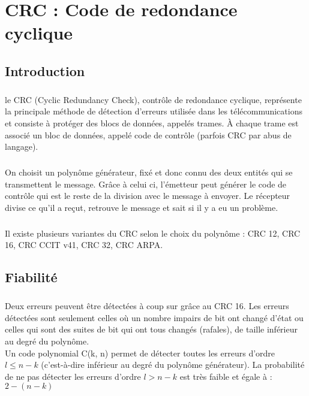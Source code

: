 
\chapter{CRC : Code de redondance cyclique}

    \section{Introduction}

        \paragraph{}
le CRC (Cyclic Redundancy Check), contrôle de redondance cyclique,
représente la principale méthode de détection d'erreurs utilisée dans les télécommunications et
consiste à protéger des blocs de données, appelés trames.
À chaque trame est associé un bloc de données, appelé code de contrôle (parfois CRC par abus de langage).
        \paragraph{}
On choisit un polynôme générateur, fixé et donc connu des deux entités qui se transmettent le message.
Grâce à celui ci, l'émetteur peut générer le code de contrôle qui est le reste de la division avec le message à envoyer.
Le récepteur divise ce qu'il a reçut, retrouve le message et sait si il y a eu un problème.
        \paragraph{}
Il existe plusieurs variantes du CRC selon le choix du polynôme : CRC 12, CRC 16, CRC CCIT v41, CRC 32, CRC ARPA.


    \clearpage

    \section{Fiabilité}

        \paragraph{}
Deux erreurs peuvent être détectées à coup sur grâce au CRC 16.
Les erreurs détectées sont seulement celles où un nombre impairs de bit ont changé d'état ou
celles qui sont des suites de bit qui ont tous changés (rafales), de taille inférieur au
degré du polynôme.
\\Un code polynomial C(k, n) permet de détecter toutes les
erreurs d’ordre $l \leq n-k$ (c’est-à-dire inférieur au degré du
polynôme générateur).
La probabilité de ne pas détecter les erreurs d’ordre $l>n-k$ est
très faible et égale à : $2-(n-k)$



